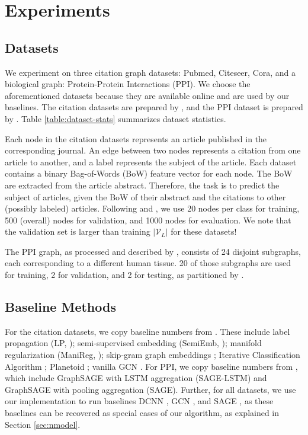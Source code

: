 
\section{Experiments}
\label{sec:experiments}


\subsection{Datasets}
We experiment on three citation graph datasets: Pubmed, Citeseer, Cora, and a biological graph: Protein-Protein Interactions (PPI).
We choose the aforementioned datasets because they are available online and are used by our baselines. The citation datasets are prepared by \cite{planetoid}, and the PPI dataset is prepared by \cite{sage}. Table \ref{table:dataset-stats} summarizes dataset statistics.



Each node in the citation datasets represents an article published in the corresponding journal. An edge between two nodes represents a citation from one article to another, and a label represents the subject of the article. Each dataset contains a binary Bag-of-Words (BoW) feature vector for each node. The BoW are extracted from the article abstract. Therefore, the task is to predict the subject of articles, given the BoW of their abstract and the citations to other (possibly labeled) articles. Following \cite{planetoid} and \cite{kipf}, we use 20 nodes per class for training, 500 (overall) nodes for validation, and 1000 nodes for evaluation. We note that the validation set is larger than training $|\mathcal{V}_L|$ for these datasets!

The PPI graph, as processed and described by \cite{sage}, consists of 24 disjoint subgraphs, each corresponding to a different human tissue. 20 of those subgraphs are used for training, 2 for validation, and 2 for testing, as partitioned by \cite{sage}.

\subsection{Baseline Methods}

For the citation datasets, we copy baseline numbers from \cite{kipf}. These include label propagation (LP, \cite{lp}); semi-supervised embedding (SemiEmb, \cite{semiemb}); manifold regularization (ManiReg, \cite{manireg}); skip-gram graph embeddings \citep[DeepWalk][]{deepwalk}; Iterative Classification Algorithm \citep[ICA, ][]{ica}; Planetoid \citep{planetoid}; vanilla GCN \citep{kipf}. For PPI, we copy baseline numbers from \citep{sage}, which include GraphSAGE with LSTM aggregation (SAGE-LSTM) and GraphSAGE with pooling aggregation (SAGE). Further, for all datasets, we use our implementation to run baselines DCNN \citep{diffusion-cnn}, GCN \citep{kipf}, and SAGE \citep[with pooling aggregation, ][]{sage}, as these baselines can be recovered as special cases of our algorithm, as explained in Section \ref{sec:nmodel}.

